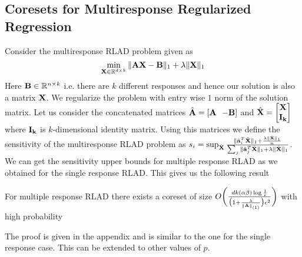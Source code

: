 \subsection{Coresets for Multiresponse Regularized Regression}
Consider the multiresponse RLAD problem given as
\begin{equation*}
    \min_{\mathbf{X} \in \mathbb{R}^{d \times k}}{\|\mathbf{AX-B}\|_1 + \lambda\|\mathbf{X}\|_1}
\end{equation*}
Here $\mathbf{B} \in \mathbb{R}^{n \times k}$ i.e. there are $k$ different responses and hence our solution is also a matrix $\mathbf{X}$. We regularize the problem with entry wise $1$ norm of the solution matrix. Let us consider the concatenated matrices $\hat{\mathbf{A}}= [\mathbf{A} ~~ \mathbf{-B}]$ and $\hat{\mathbf{X}}=\begin{bmatrix} \mathbf{X}\\ \mathbf{I_k} \end{bmatrix}$ where $\mathbf{I_k}$ is $k$-dimensional identity matrix. Using this matrices we define the sensitivity of the multiresponse RLAD problem as $s_i=\sup_{\hat{\mathbf{X}}}  \frac{\|\hat{\mathbf{a}}_i^T\hat{\mathbf{X}}\|_1 + \frac{\lambda\|\hat{\mathbf{X}}\|_1}{n}}{ \sum_{j}\|\hat{\mathbf{a}}_j^T\hat{\mathbf{X}}\|_1 +\lambda\|\hat{\mathbf{X}}\|_1}$. 
We can get the sensitivity upper bounds for multiple response RLAD as we obtained for the single response RLAD. This gives us the following result
\begin{corollary}\label{cor:mreslpr}
For multiple response RLAD there exists a coreset of size ${O}\bigg(\frac{dk(\alpha\beta)\log{\frac{1}{\epsilon}}}{\big(1+\frac{\lambda}{\|\hat{\mathbf{A}}\|_{(1)}}\big)\epsilon^2}\bigg)$ with high probability 
\end{corollary}
The proof is given in the appendix and is similar to the one for the single response case. This can be extended to other values of $p$.